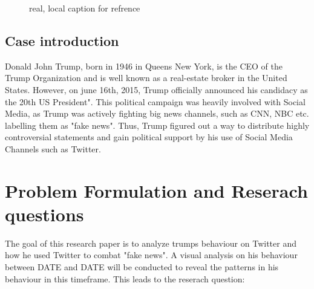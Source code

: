 \documentclass{article}
\begin{document}


\begin{figure}[H] %
	\centering %
	\caption[Optional caption] {real, local caption for refrence}
	\label{fig:wordcloudBliz}

\end{figure}






\subsection{Case introduction}
Donald John Trump, born in 1946 in Queens New York, is the CEO of the Trump Organization and is well known as a real-estate broker in the United States.
However, on june 16th, 2015, Trump officially announced his candidacy as the 20th US President". This political campaign was heavily involved with Social Media, as Trump was actively fighting big news channels, such
as CNN, NBC etc. labelling them as "fake news". Thus, Trump figured out a way to distribute highly controversial statements and gain political support by his use of Social Media Channels such as Twitter. 



\cleardoublepage





\section{Problem Formulation and Reserach questions} \label{sec:ch1}
The goal of this research paper is to analyze  trumps behaviour on Twitter and how he used Twitter to combat "fake news". A visual analysis on his behaviour between DATE and DATE will be conducted to reveal the patterns in his behaviour in this timeframe. This leads to the reserach question: 
\end{document}
